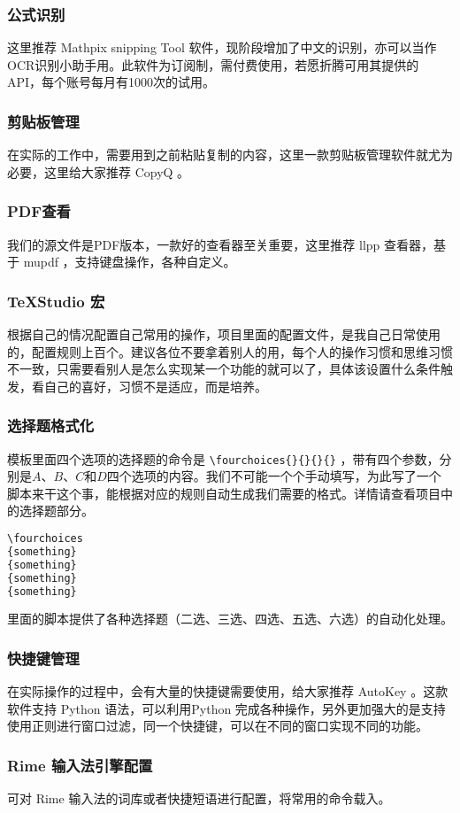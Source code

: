 \subsubsection{公式识别}

这里推荐 Mathpix snipping Tool 软件，现阶段增加了中文的识别，亦可以当作OCR识别小助手用。此软件为订阅制，需付费使用，若愿折腾可用其提供的API，每个账号每月有1000次的试用。


\subsubsection{剪贴板管理}
在实际的工作中，需要用到之前粘贴复制的内容，这里一款剪贴板管理软件就尤为必要，这里给大家推荐 CopyQ 。



\subsubsection{PDF查看}

我们的源文件是PDF版本，一款好的查看器至关重要，这里推荐 llpp 查看器，基于 mupdf ，支持键盘操作，各种自定义。

\subsubsection{TeXStudio 宏}

根据自己的情况配置自己常用的操作，项目里面的配置文件，是我自己日常使用的，配置规则上百个。建议各位不要拿着别人的用，每个人的操作习惯和思维习惯不一致，只需要看别人是怎么实现某一个功能的就可以了，具体该设置什么条件触发，看自己的喜好，习惯不是适应，而是培养。


\subsubsection{选择题格式化}

模板里面四个选项的选择题的命令是  \lstinline|\fourchoices{}{}{}{}| ，带有四个参数，分别是$ A $、$ B $、$ C $和$ D $四个选项的内容。我们不可能一个个手动填写，为此写了一个脚本来干这个事，能根据对应的规则自动生成我们需要的格式。详情请查看项目中的选择题部分。
\begin{lstlisting}[language=bash]
\fourchoices
{something}
{something}
{something}
{something}
\end{lstlisting}
里面的脚本提供了各种选择题（二选、三选、四选、五选、六选）的自动化处理。

\subsubsection{快捷键管理}

在实际操作的过程中，会有大量的快捷键需要使用，给大家推荐 AutoKey 。这款软件支持 Python 语法，可以利用Python 完成各种操作，另外更加强大的是支持使用正则进行窗口过滤，同一个快捷键，可以在不同的窗口实现不同的功能。



\subsubsection{Rime 输入法引擎配置}

可对 Rime 输入法的词库或者快捷短语进行配置，将常用的命令载入。



